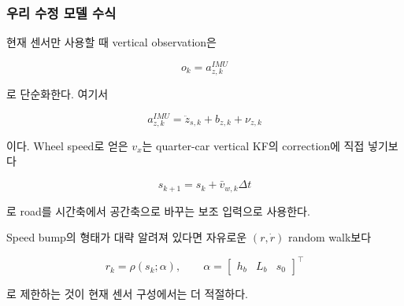\documentclass[letterpaper,10pt,journal,twocolumn]{ieeeconf}
\begin{document}
\subsubsection{우리 수정 모델 수식}

현재 센서만 사용할 때 vertical observation은

\[
o_k
=
a_{z,k}^{IMU}
\]

로 단순화한다. 여기서

\[
a_{z,k}^{IMU}
=
\ddot z_{s,k}+b_{z,k}+\nu_{z,k}
\]

이다. Wheel speed로 얻은 \(v_x\)는 quarter-car vertical KF의 correction에 직접 넣기보다

\[
s_{k+1}=s_k+\bar v_{w,k}\Delta t
\]

로 road를 시간축에서 공간축으로 바꾸는 보조 입력으로 사용한다.

Speed bump의 형태가 대략 알려져 있다면 자유로운 \((r,\dot r)\) random walk보다

\[
r_k=\rho(s_k;\alpha),
\qquad
\alpha=
\begin{bmatrix}
h_b&L_b&s_0
\end{bmatrix}^{\top}
\]

로 제한하는 것이 현재 센서 구성에서는 더 적절하다.
\end{document}
